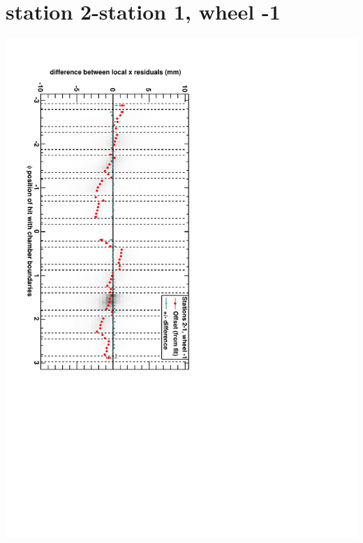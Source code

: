 \documentclass[compress]{beamer}
\begin{document}
\section*{station 2-station 1, wheel -1}
\begin{frame} \vfill \mbox{\hspace{-1 cm}\includegraphics[height=1.2\linewidth, angle=90]{DTrphidiff12VsPhi_whB_slope.pdf}} \end{frame}
\end{document}

